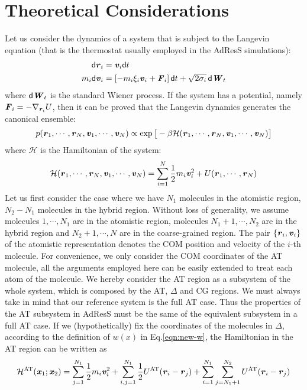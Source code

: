 \documentclass[aps,pre,preprint]{revtex4}
\renewcommand{\v}[1]{\textbf{\textit{#1}}}
\renewcommand{\d}[1]{\textsf{#1}}
\begin{document}
\section{Theoretical Considerations}
Let us consider the dynamics of a system that is subject to the Langevin equation (that is the thermostat usually employed in the AdResS simulations):
\begin{align}
  \d d\v r_i &= \v v_i\d dt\\
  m_i\d d\v v_i &= [-m_i\xi_i\v v_i + \v F_i]\,\d dt + \sqrt{2\sigma_i}\,\d d\v W_t
\end{align}
where $\d d\v W_t$ is the standard Wiener process.  If the system has a
potential, namely $\v F_i = -\nabla_{\v r_i}U$, then it can be proved that the
Langevin dynamics generates the canonical ensemble:
\begin{align}
  p(\v r_1, \cdots, \v r_N, \v v_1, \cdots, \v v_N)
  \propto \exp\big[
  -\beta \mathcal H(\v r_1, \cdots, \v r_N, \v v_1, \cdots, \v v_N)
  \big]
\end{align}
where $\mathcal H$ is the Hamiltonian of the system:
\begin{align}
  \mathcal H(\v r_1, \cdots, \v r_N, \v v_1, \cdots, \v v_N)
  =
  \sum_{i=1}^N\frac12 m_i\v v_i^2 + U(\v r_1, \cdots, \v r_N)  
\end{align}
Let us first consider the case where we have $N_1$
molecules in the atomistic region, $N_2 - N_1$ molecules in the hybrid
region.  Without loss of generality, we assume molecules $1, \cdots,
N_1$ are in the atomistic region, molecules $N_1 + 1, \cdots, N_2$ are
in the hybrid region and $N_2+1, \cdots, N$ are in the coarse-grained
region. The pair $\{\v r_i, \v v_i\}$ of the atomistic representation
denotes the COM position and velocity of the $i$-th
molecule. For convenience, we only consider the COM coordinates of the
AT molecule, all the arguments employed here
can be easily extended to treat each atom of the molecule.
We hereby consider the AT region as a subsystem of the whole
system, which is composed by the AT, $\Delta$ and CG
regions. We must always take in mind that our reference system is the full AT case.
Thus the properties of the AT subsystem in AdResS must be the same of the equivalent subsystem in a full AT case.
 If we (hypothetically) fix the coordinates of the molecules in $\Delta$, according to the definition of $w(x)$ in Eq.\ref{eqn:new-w}, the Hamiltonian in the AT region can be written as
\begin{align}
  \mathcal H^{\textrm{AT}}(\v x_1; \v x_2) =
  \sum_{j=1}^{N_1}\frac12 m_i\v v_i^2 + 
  \sum_{i,j=1}^{N_1}\frac12 U^{\textrm{AT}}(\v r_i - \v r_j) + 
  \sum_{i=1}^{N_1}\sum_{j=N_1+1}^{N_2} U^{\textrm{AT}}(\v r_i - \v r_j) 
\end{align}
\end{document}
